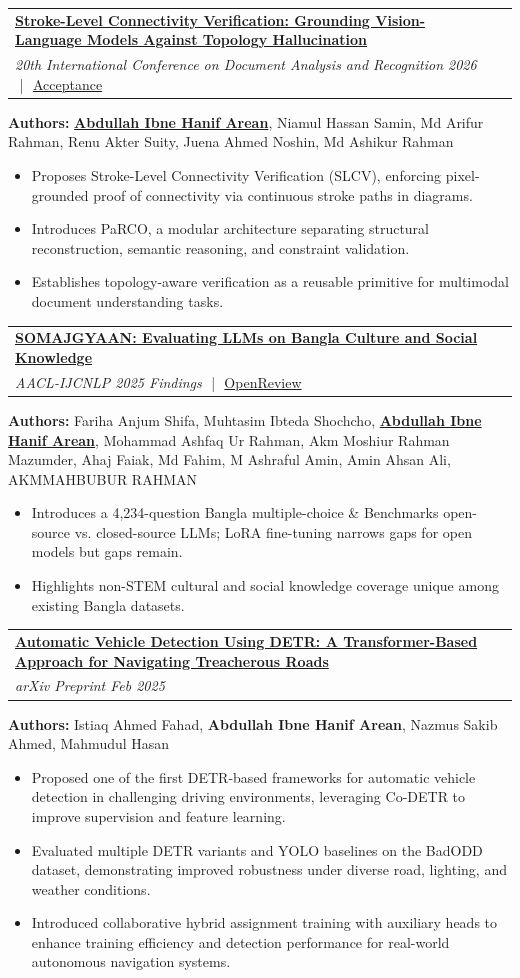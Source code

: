 \documentclass[letterpaper,11pt]{article}
\makeatletter
\newcommand{\resumeItem}[1]{
  \item\small{
    {#1 \vspace{-2pt}}
  }
}
\newcommand{\resumeProjectHeading}[2]{
    \item
    \begin{tabular*}{1.0\textwidth}{l@{\extracolsep{\fill}}r}
      \small#1 & \textbf{\small #2}\\
    \end{tabular*}\vspace{1pt} %
}
\newcommand{\resumeItemListStart}{\begin{itemize}}
\newcommand{\resumeItemListEnd}{\end{itemize}}
\makeatother
\begin{document}
  \resumeProjectHeading
    {\textbf{\href{https://www.linkedin.com/posts/abdullaharean_icdar2026-documentanalysis-visionlanguagemodels-activity-7462140293249650689-WpDO}{Stroke-Level Connectivity Verification: Grounding Vision-Language Models Against Topology Hallucination}} \\
    \small \textit{20th International Conference on Document Analysis and Recognition 2026} \,\,|\,\, \href{https://www.linkedin.com/posts/abdullaharean_icdar2026-documentanalysis-visionlanguagemodels-activity-7462140293249650689-WpDO}{Acceptance}}
    {}
  {\small
  \textbf{Authors:} \textbf{\href{https://openreview.net/profile?id=~Abdullah_Ibne_Hanif_Arean1}{Abdullah Ibne Hanif Arean}}, Niamul Hassan Samin, Md Arifur Rahman, Renu Akter Suity, Juena Ahmed Noshin, Md Ashikur Rahman
  }
  \resumeItemListStart
    \resumeItem{Proposes Stroke-Level Connectivity Verification (SLCV), enforcing pixel-grounded proof of connectivity via continuous stroke paths in diagrams.}
    \resumeItem{Introduces PaRCO, a modular architecture separating structural reconstruction, semantic reasoning, and constraint validation.}
    \resumeItem{Establishes topology-aware verification as a reusable primitive for multimodal document understanding tasks.}
  \resumeItemListEnd
  \resumeProjectHeading
    {\textbf{\href{https://aclanthology.org/2025.findings-ijcnlp.134/}{SOMAJGYAAN: Evaluating LLMs on Bangla Culture and Social Knowledge}} \\
    \small \textit{AACL-IJCNLP 2025 Findings} \,\,|\,\, \href{https://openreview.net/forum?id=iE3WjTJq8s}{OpenReview}}
    {}
  {\small
  \textbf{Authors:} Fariha Anjum Shifa, Muhtasim Ibteda Shochcho, \textbf{\href{https://openreview.net/profile?id=~Abdullah_Ibne_Hanif_Arean1}{Abdullah Ibne Hanif Arean}}, Mohammad Ashfaq Ur Rahman, Akm Moshiur Rahman Mazumder, Ahaj Faiak, Md Fahim, M Ashraful Amin, Amin Ahsan Ali, AKMMAHBUBUR RAHMAN
  }
  \resumeItemListStart
    \resumeItem{Introduces a 4,234-question Bangla multiple-choice \& Benchmarks open-source vs. closed-source LLMs; LoRA fine-tuning narrows gaps for open models but gaps remain.}
    \resumeItem{Highlights non-STEM cultural and social knowledge coverage unique among existing Bangla datasets.}
  \resumeItemListEnd

\resumeProjectHeading
    {\textbf{\href{https://arxiv.org/abs/2502.17843}{Automatic Vehicle Detection Using DETR: A Transformer-Based Approach for Navigating Treacherous Roads}} \\
    \small \textit{arXiv Preprint Feb 2025}}
    {}
  {\small
  \textbf{Authors:} Istiaq Ahmed Fahad, \textbf{Abdullah Ibne Hanif Arean}, Nazmus Sakib Ahmed, Mahmudul Hasan
  }
  \resumeItemListStart
    \resumeItem{Proposed one of the first DETR-based frameworks for automatic vehicle detection in challenging driving environments, leveraging Co-DETR to improve supervision and feature learning.}
    \resumeItem{Evaluated multiple DETR variants and YOLO baselines on the BadODD dataset, demonstrating improved robustness under diverse road, lighting, and weather conditions.}
    \resumeItem{Introduced collaborative hybrid assignment training with auxiliary heads to enhance training efficiency and detection performance for real-world autonomous navigation systems.}
  \resumeItemListEnd
\end{document}
